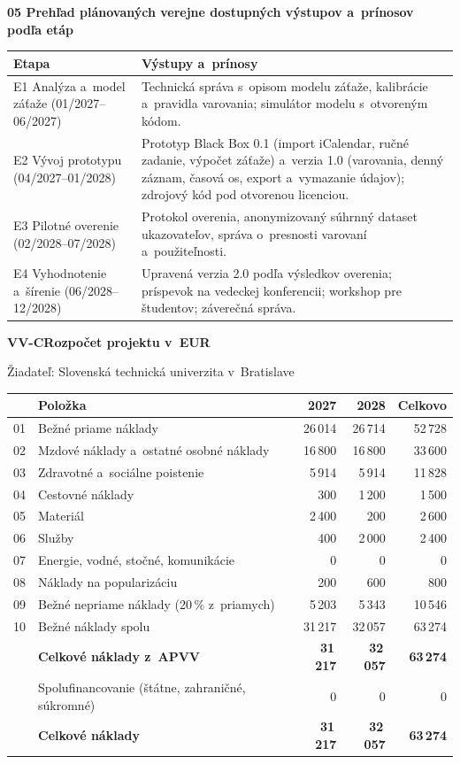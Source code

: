 \documentclass[10pt,a4paper]{article}
\newcommand{\cast}[2]{%
  \par\medskip
  \noindent\colorbox{black!10}{\parbox{\dimexpr\linewidth-2\fboxsep}{%
    \textbf{#1}\hfill\textbf{#2}}}\par\smallskip}
\begin{document}
\textbf{05 \quad Prehľad plánovaných verejne dostupných výstupov a~prínosov podľa etáp}

\noindent
\begin{tabularx}{\linewidth}{|>{\raggedright\arraybackslash}p{38mm}|X|}
\hline
\textbf{Etapa} & \textbf{Výstupy a~prínosy} \\ \hline
E1 Analýza a~model záťaže (01/2027--06/2027) & Technická správa s~opisom modelu záťaže, kalibrácie a~pravidla varovania; simulátor modelu s~otvoreným kódom. \\ \hline
E2 Vývoj prototypu (04/2027--01/2028) & Prototyp Black Box 0.1 (import iCalendar, ručné zadanie, výpočet záťaže) a~verzia 1.0 (varovania, denný záznam, časová os, export a~vymazanie údajov); zdrojový kód pod otvorenou licenciou. \\ \hline
E3 Pilotné overenie (02/2028--07/2028) & Protokol overenia, anonymizovaný súhrnný dataset ukazovateľov, správa o~presnosti varovaní a~použiteľnosti. \\ \hline
E4 Vyhodnotenie a~šírenie (06/2028--12/2028) & Upravená verzia 2.0 podľa výsledkov overenia; príspevok na vedeckej konferencii; workshop pre študentov; záverečná správa. \\ \hline
\end{tabularx}

\cast{VV-C}{Rozpočet projektu v~EUR}

Žiadateľ: Slovenská technická univerzita v~Bratislave

\noindent
\begin{tabularx}{\linewidth}{|c|X|r|r|r|}
\hline
 & \textbf{Položka} & \textbf{2027} & \textbf{2028} & \textbf{Celkovo} \\ \hline
01 & Bežné priame náklady & 26\,014 & 26\,714 & 52\,728 \\ \hline
02 & \quad Mzdové náklady a~ostatné osobné náklady & 16\,800 & 16\,800 & 33\,600 \\ \hline
03 & \quad Zdravotné a~sociálne poistenie & 5\,914 & 5\,914 & 11\,828 \\ \hline
04 & \quad Cestovné náklady & 300 & 1\,200 & 1\,500 \\ \hline
05 & \quad Materiál & 2\,400 & 200 & 2\,600 \\ \hline
06 & \quad Služby & 400 & 2\,000 & 2\,400 \\ \hline
07 & \quad Energie, vodné, stočné, komunikácie & 0 & 0 & 0 \\ \hline
08 & \quad Náklady na popularizáciu & 200 & 600 & 800 \\ \hline
09 & Bežné nepriame náklady (20\,\% z~priamych) & 5\,203 & 5\,343 & 10\,546 \\ \hline
10 & Bežné náklady spolu & 31\,217 & 32\,057 & 63\,274 \\ \hline
   & \textbf{Celkové náklady z~APVV} & \textbf{31\,217} & \textbf{32\,057} & \textbf{63\,274} \\ \hline
   & Spolufinancovanie (štátne, zahraničné, súkromné) & 0 & 0 & 0 \\ \hline
   & \textbf{Celkové náklady} & \textbf{31\,217} & \textbf{32\,057} & \textbf{63\,274} \\ \hline
\end{tabularx}
\end{document}

